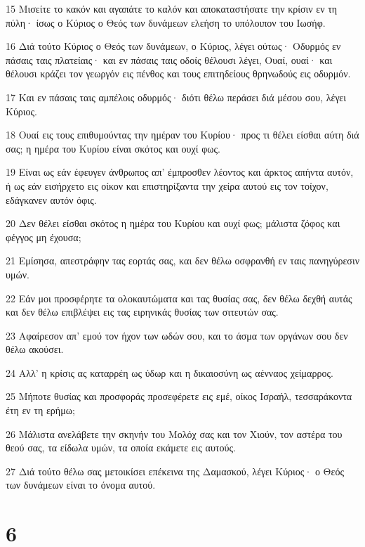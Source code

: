 \par 15 Μισείτε το κακόν και αγαπάτε το καλόν και αποκαταστήσατε την κρίσιν εν τη πύλη· ίσως ο Κύριος ο Θεός των δυνάμεων ελεήση το υπόλοιπον του Ιωσήφ.
\par 16 Διά τούτο Κύριος ο Θεός των δυνάμεων, ο Κύριος, λέγει ούτως· Οδυρμός εν πάσαις ταις πλατείαις· και εν πάσαις ταις οδοίς θέλουσι λέγει, Ουαί, ουαί· και θέλουσι κράζει τον γεωργόν εις πένθος και τους επιτηδείους θρηνωδούς εις οδυρμόν.
\par 17 Και εν πάσαις ταις αμπέλοις οδυρμός· διότι θέλω περάσει διά μέσου σου, λέγει Κύριος.
\par 18 Ουαί εις τους επιθυμούντας την ημέραν του Κυρίου· προς τι θέλει είσθαι αύτη διά σας; η ημέρα του Κυρίου είναι σκότος και ουχί φως.
\par 19 Είναι ως εάν έφευγεν άνθρωπος απ' έμπροσθεν λέοντος και άρκτος απήντα αυτόν, ή ως εάν εισήρχετο εις οίκον και επιστηρίξαντα την χείρα αυτού εις τον τοίχον, εδάγκανεν αυτόν όφις.
\par 20 Δεν θέλει είσθαι σκότος η ημέρα του Κυρίου και ουχί φως; μάλιστα ζόφος και φέγγος μη έχουσα;
\par 21 Εμίσησα, απεστράφην τας εορτάς σας, και δεν θέλω οσφρανθή εν ταις πανηγύρεσιν υμών.
\par 22 Εάν μοι προσφέρητε τα ολοκαυτώματα και τας θυσίας σας, δεν θέλω δεχθή αυτάς και δεν θέλω επιβλέψει εις τας ειρηνικάς θυσίας των σιτευτών σας.
\par 23 Αφαίρεσον απ' εμού τον ήχον των ωδών σου, και το άσμα των οργάνων σου δεν θέλω ακούσει.
\par 24 Αλλ' η κρίσις ας καταρρέη ως ύδωρ και η δικαιοσύνη ως αένναος χείμαρρος.
\par 25 Μήποτε θυσίας και προσφοράς προσεφέρετε εις εμέ, οίκος Ισραήλ, τεσσαράκοντα έτη εν τη ερήμω;
\par 26 Μάλιστα ανελάβετε την σκηνήν του Μολόχ σας και τον Χιούν, τον αστέρα του θεού σας, τα είδωλα υμών, τα οποία εκάμετε εις αυτούς.
\par 27 Διά τούτο θέλω σας μετοικίσει επέκεινα της Δαμασκού, λέγει Κύριος· ο Θεός των δυνάμεων είναι το όνομα αυτού.

\chapter{6}

